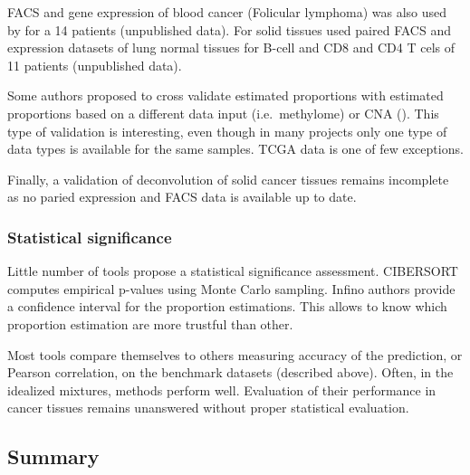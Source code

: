\documentclass[12pt,]{book}
\theoremstyle{definition}
\theoremstyle{definition}
\theoremstyle{definition}
\theoremstyle{remark}
\begin{document}
FACS and gene expression of blood cancer (Folicular lymphoma) was also
used by \citet{Newman2015} for a 14 patients (unpublished data). For
solid tissues \citet{Newman2015} used paired FACS and expression
datasets of lung normal tissues for B-cell and CD8 and CD4 T cels of 11
patients (unpublished data).

Some authors proposed to cross validate estimated proportions with
estimated proportions based on a different data input (i.e.~methylome)
\citep[\citet{Senbabaoglu2016}]{Li2016} or CNA
(\citet{Senbabaoglu2016}). This type of validation is interesting, even
though in many projects only one type of data types is available for the
same samples. TCGA data is one of few exceptions.

Finally, a validation of deconvolution of solid cancer tissues remains
incomplete as no paried expression and FACS data is available up to
date.

\hypertarget{statistical-significance}{%
\subsubsection{Statistical
significance}\label{statistical-significance}}

Little number of tools propose a statistical significance assessment.
CIBERSORT computes empirical p-values using Monte Carlo sampling. Infino
authors \citep{Zaslavsky2017} provide a confidence interval for the
proportion estimations. This allows to know which proportion estimation
are more trustful than other.

Most tools compare themselves to others measuring accuracy of the
prediction, or Pearson correlation, on the benchmark datasets (described
above). Often, in the idealized mixtures, methods perform well.
Evaluation of their performance in cancer tissues remains unanswered
without proper statistical evaluation.

\hypertarget{summary-2}{%
\subsection{Summary}\label{summary-2}}
\end{document}
